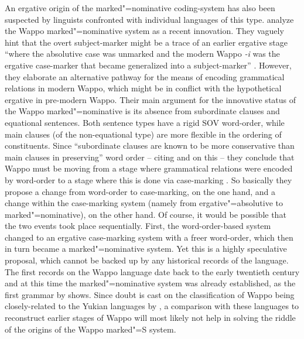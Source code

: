 An ergative origin of the marked"=nominative coding-system has also been suspected by linguists confronted with individual languages of this type. 
\citet{Lietal:1977} analyze the Wappo marked"=nominative system as a recent innovation. 
They vaguely hint that the overt subject-marker might be a trace of an earlier ergative stage ``where the absolutive case was unmarked and the modern Wappo \emph{-i} was the ergative case-marker that became generalized into a subject-marker'' \citep[98]{Lietal:1977}. 
However, they elaborate an alternative pathway for the means of encoding grammatical relations in modern Wappo, which might be in conflict with the hypothetical ergative in pre-modern Wappo. 
Their main argument for the innovative status of the Wappo marked"=nominative is its absence from subordinate clauses and equational sentences. 
Both sentence types have a rigid SOV word-order, while main clauses (of the non-equational type) are more flexible in the ordering of constituents. 
Since ``subordinate clauses are known to be more conservative than main clauses in preserving'' word order -- citing \citet{Lehmann:1974} and \citet{Vennemann:1975} on this -- they conclude that Wappo must be moving from a stage where grammatical relations were encoded by word-order to a stage where this is done via case-marking \citep[100]{Lietal:1977}. 
So basically they propose a change from word-order to case-marking, on the one hand, and a change within the case-marking system (namely from ergative"=absolutive to marked"=nominative), on the other hand. 
Of course, it would be possible that the two events took place sequentially. 
First, the word-order-based system changed to an ergative case-marking system with a freer word-order, which then in turn became a marked"=nominative system. 
Yet this is a highly speculative proposal, which cannot be backed up by any historical records of the language. 
The first records on the Wappo language date back to the early twentieth century and at this time the marked"=nominative system was already established, as the first grammar by \citet[131]{Radin:1929} shows. 
Since doubt is cast on the classification of Wappo being closely-related to the Yukian languages by \citet{Sawyer:1980}, a comparison with these languages to reconstruct earlier stages of Wappo will most likely not help in solving the riddle of the origins of the Wappo marked"=S system. 

